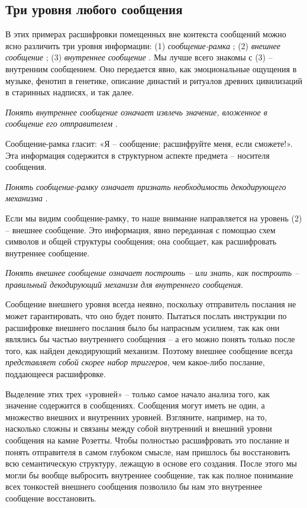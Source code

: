 \documentclass[../main.tex]{subfiles}
\begin{document}
\subsection{Три уровня любого сообщения}

В этих примерах расшифровки помещенных вне контекста сообщений можно ясно различить три уровня информации: (1) \emph{сообщение-рамка} ; (2) \emph{внешнее сообщение} ; (3) \emph{внутреннее сообщение} . Мы лучше всего знакомы с (3) \--- внутренним сообщением. Оно передается явно, как эмоциональные ощущения в музыке, фенотип в генетике, описание династий и ритуалов древних цивилизаций в старинных надписях, и так далее.

\emph{Понять внутреннее сообщение означает извлечь значение, вложенное в сообщение его отправителем} .

Сообщение-рамка гласит: «Я \--- сообщение; расшифруйте меня, если сможете!». Эта информация содержится в структурном аспекте предмета \--- носителя сообщения.

\emph{Понять сообщение-рамку означает признать необходимость декодирующего механизма} .

Если мы видим сообщение-рамку, то наше внимание направляется на уровень (2) \--- внешнее сообщение. Это информация, явно переданная с помощью схем символов и общей структуры сообщения; она сообщает, как расшифровать внутреннее сообщение.

\emph{Понять внешнее сообщение означает построить \--- или знать, как построить \--- правильный декодирующий механизм для внутреннего сообщения}.

Сообщение внешнего уровня всегда неявно, поскольку отправитель послания не может гарантировать, что оно будет понято. Пытаться послать инструкции по расшифровке внешнего послания было бы напрасным усилием, так как они являлись бы частью внутреннего сообщения \--- а его можно понять только после того, как найден декодирующий механизм. Поэтому внешнее сообщение всегда \emph{представляет собой скорее набор триггеров}, чем какое-либо послание, поддающееся расшифровке.

Выделение этих трех «уровней» \--- только самое начало анализа того, как значение содержится в сообщениях. Сообщения могут иметь не один, а множество внешних и внутренних уровней. Взгляните, например, на то, насколько сложны и связаны между собой внутренний и внешний уровни сообщения на камне Розетты. Чтобы полностью расшифровать это послание и понять отправителя в самом глубоком смысле, нам пришлось бы восстановить всю семантическую структуру, лежащую в основе его создания. После этого мы могли бы вообще выбросить внутреннее сообщение, так как полное понимание всех тонкостей внешнего сообщения позволило бы нам это внутреннее сообщение восстановить.
\end{document}
